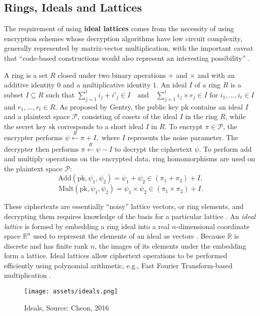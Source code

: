 \documentclass{article}
\begin{document}
\subsection{Rings, Ideals and Lattices}

The requirement of using \textbf{ideal lattices} comes from the necessity of using encryption schemes whose decryption algorithms have low circuit complexity, generally represented by matrix-vector multiplication, with the important caveat that ``code-based constructions would also represent an interesting possibility'' \cite{gentry2009fully}.

A ring is a set $R$ closed under two binary operations $+$ and $\times$ and with an additive identity $0$ and a multiplicative identity $1$. An ideal $I$ of a ring $R$ is a subset $I \subseteq R$ such that $\sum_{j=1}^{t} i_j + i'_j \in I 
\quad \text{and} \quad
\sum_{j=1}^{t} i_j \times r_j \in I $
for $i_1, \dots, i_t \in I$ and $r_1, \dots, r_t \in R$. As proposed by Gentry, the public key $\text{pk}$ contains an ideal $I$ and a plaintext space $\mathcal{P}$, consisting of cosets of the ideal $I$ in the ring $R$, while the secret key $\text{sk}$ corresponds to a short ideal $I$ in $R$. To encrypt $\pi \in \mathcal{P}$, the encrypter performs 
$\psi \xleftarrow{R} \pi + I,$
where $I$ represents the noise parameter. The decrypter then performs 
$\pi \xleftarrow{R} \psi - I$
to decrypt the ciphertext $\psi$. To perform add and multiply operations on the encrypted data, ring homomorphisms are used on the plaintext space $\mathcal{P}$:
\[
\text{Add}(\text{pk}, \psi_1, \psi_2) = \psi_1 + \psi_2 \in (\pi_1 + \pi_2) + I,
\]
\[
\text{Mult}(\text{pk}, \psi_1, \psi_2) = \psi_1 \times \psi_2 \in (\pi_1 \times \pi_2) + I.
\]

These ciphertexts are essentially ``noisy'' lattice vectors, or ring elements, and decrypting them requires knowledge of the basis for a particular lattice \cite{ajtai1996generating}. An \emph{ideal lattice} is formed by embedding a ring ideal into a real $n$-dimensional coordinate space $\mathbb{R}^n$ used to represent the elements of an ideal as vectors \cite{lyubashevsky2010ideal}. Because $\mathbb{R}$ is discrete and has finite rank $n$, the images of its elements under the embedding form a lattice. Ideal lattices allow ciphertext operations to be performed efficiently using polynomial arithmetic, e.g., Fast Fourier Transform-based multiplication \cite{regev2009lattices}.

\begin{figure}[h]
    \centering
    \texttt{[image: assets/ideals.png]}
    \caption{Ideals, Source: Cheon, 2016}
\end{figure}
\end{document}

